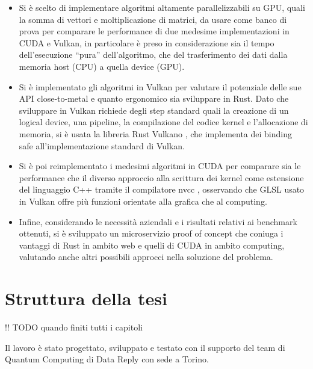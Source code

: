 \begin{itemize}
    \item Si è scelto di implementare algoritmi altamente parallelizzabili su GPU, quali la somma di vettori e moltiplicazione di matrici, da usare come banco di prova per comparare le performance di due medesime implementazioni in CUDA e Vulkan, in particolare è preso in considerazione sia il tempo dell'esecuzione ``pura'' dell'algoritmo, che del trasferimento dei dati dalla memoria host (CPU) a quella device (GPU).
    \item Si è implementato gli algoritmi in Vulkan per valutare il potenziale delle sue API close-to-metal e quanto ergonomico sia sviluppare in Rust. Dato che sviluppare in Vulkan richiede degli step standard quali la creazione di un logical device, una pipeline, la compilazione del codice kernel e l'allocazione di memoria, si è usata la libreria Rust Vulkano \cite[]{github:Vulkano}, che implementa dei binding safe all'implementazione standard di Vulkan.
    \item Si è poi reimplementato i medesimi algoritmi in CUDA per comparare sia le performance che il diverso approccio alla scrittura dei kernel come estensione del linguaggio C++ tramite il compilatore nvcc \cite[]{NVIDIA:nvcc}, osservando che GLSL \cite[]{KG:GLSL} usato in Vulkan offre più funzioni orientate alla grafica che al computing.
    \item Infine, considerando le necessità aziendali e i risultati relativi ai benchmark ottenuti, si è sviluppato un microservizio proof of concept che coniuga i vantaggi di Rust in ambito web e quelli di CUDA in ambito computing, valutando anche altri possibili approcci nella soluzione del problema.
\end{itemize}



\section[Struttura della tesi]{Struttura della tesi}

!! TODO quando finiti tutti i capitoli

Il lavoro è stato progettato, sviluppato e testato con il supporto del team di Quantum Computing di Data Reply con sede a Torino. 

